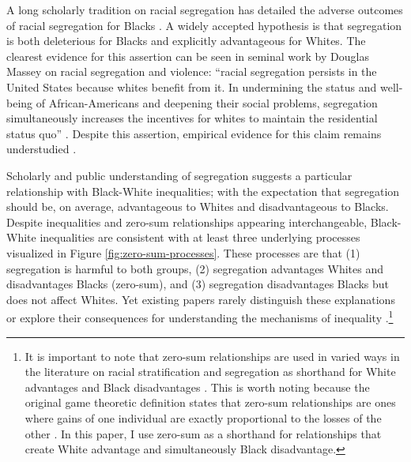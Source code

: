\documentclass[11pt]{article}
\begin{document}
A long scholarly tradition on racial segregation has detailed the adverse outcomes of racial segregation for Blacks \citep{hendi_where_2024,massey_effect_1987,frey_central_1979}. A widely accepted hypothesis is that segregation is both deleterious for Blacks and explicitly advantageous for Whites. The clearest evidence for this assertion can be seen in seminal work by Douglas Massey on racial segregation and violence: ``racial segregation persists in the United States because whites benefit from it. In undermining the status and well-being of African-Americans and deepening their social problems, segregation simultaneously increases the incentives for whites to maintain the residential status quo'' \citep[p.~1229]{massey_getting_1995}. Despite this assertion, empirical evidence for this claim remains understudied \citep{brown_structural_2024,quillian_does_2014}.

Scholarly and public understanding of segregation suggests a particular relationship with Black-White inequalities; with the expectation that segregation should be, on average, advantageous to Whites \citep{light_segregation_2019,quillian_does_2014,massey_getting_1995} and disadvantageous to Blacks. Despite inequalities and zero-sum relationships appearing interchangeable, Black-White inequalities are consistent with at least three underlying processes visualized in Figure \ref{fig:zero-sum-processes}. These processes are that (1) segregation is harmful to both groups, (2) segregation advantages Whites and disadvantages Blacks (zero-sum), and (3) segregation disadvantages Blacks but does not affect Whites. Yet existing papers rarely distinguish these explanations or explore their consequences for understanding the mechanisms of inequality \citep{wrigley-field_three_2025}.\footnote{It is important to note that zero-sum relationships are used in varied ways in the literature on racial stratification and segregation as shorthand for White advantages and Black disadvantages \citep{mcghee_sum_2021}. This is worth noting because the original game theoretic definition states that zero-sum relationships are ones where gains of one individual are exactly proportional to the losses of the other \citep{von-neumann_theory_1944}. In this paper, I use zero-sum as a shorthand for relationships that create White advantage and simultaneously Black disadvantage.} 
\end{document}
